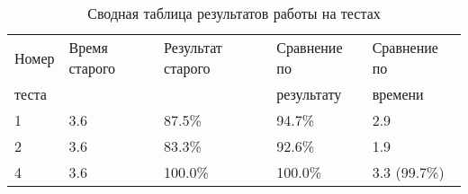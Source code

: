 \begin{table}[ht]
  \centering
  \begin{tabular}{|l|l|l|l|l|}
\hline
    Номер & Время старого & Результат старого & Сравнение по & Сравнение по \\
    теста     & & & результату & времени \\
\hline
    1 & 3.6 & 87.5\% & 94.7\% & 2.9 \\ 
    2 & 3.6 & 83.3\% & 92.6\% & 1.9 \\
    4 & 3.6 & 100.0\%& 100.0\%& 3.3 (99.7\%) \\
\hline

  \end{tabular}
  \captionsetup{justification=centering}
  \caption{Сводная таблица результатов работы на тестах}
  \label{results}
\end{table}

\FloatBarrier